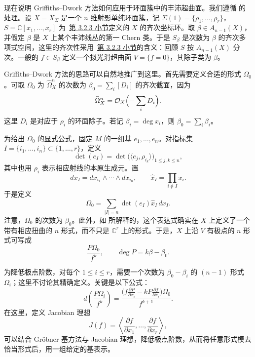 现在说明 Griffiths--Dwork 方法如何应用于环面簇中的丰沛超曲面。我们遵循  的处理。设 $X=X_\Sigma$ 是一个 $n$ 维射影单纯环面簇，记 $\Sigma(1)=\{\rho_1,\ldots,\rho_r\}$，$S=\mathbb C[x_1,\ldots,x_r]$ 为~\hyperref[subsec:homogeneous-ring]{第 3.2.3 小节}定义的 $X$ 的齐次坐标环。取 $\beta\in A_{n-1}(X)$，并假定 $\beta$ 是 $X$ 上某个丰沛线丛的第一 Chern 类。于是 $S_\beta$ 是次数为 $\beta$ 的齐次多项式空间，这里的齐次性采用~\hyperref[subsec:homogeneous-ring]{第 3.2.3 小节}的含义：回顾 $S$ 按 $A_{n-1}(X)$ 分次。一般的 $f\in S_\beta$ 定义一个拟光滑超曲面 $V=\{f=0\}$，其除子类为 $\beta$。

Griffiths--Dwork 方法的思路可以自然地推广到这里。首先需要定义合适的形式 $\Omega_0$。可取 $\Omega_0$ 为 $\widehat\Omega_X^n$ 的次数为 $\beta_0=\sum_i[D_i]$ 的齐次截面，因为
\[
\widehat\Omega_X^n=\mathcal O_X\Bigl(-\sum_iD_i\Bigr).
\]
这里 $D_i$ 是对应于 $\rho_i$ 的环面除子。若记 $\beta_i=\deg x_i$，则 $\beta_0=\sum_i\beta_i$。

为给出 $\Omega_0$ 的显式公式，固定 $M$ 的一组基 $e_1,\ldots,e_n$。对指标集 $I=\{i_1,\ldots,i_n\}\subset\{1,\ldots,r\}$，定义
\[
\det(e_I)=\det\bigl(\langle e_j,\rho_{i_k}\rangle\bigr)_{1\leq j,k\leq n},
\]
其中也用 $\rho_i$ 表示相应射线的本原生成元。置
\[
dx_I=dx_{i_1}\wedge\cdots\wedge dx_{i_n},\qquad
\widehat x_I=\prod_{i\notin I}x_i.
\]
于是定义
\begin{equation}\label{eq:toric-volume-form}
\Omega_0=\sum_{|I|=n}\det(e_I)\widehat x_I\,dx_I.
\end{equation}
注意，$\Omega_0$ 的次数为 $\beta_0$。此外，如  所解释的，这个表达式确实在 $X$ 上定义了一个带有相应扭曲的 $n$ 形式，而不只是 $\mathbb C^r$ 上的形式。于是，$X$ 上沿 $V$ 有极点的 $n$ 形式可写成
\[
\frac{P\Omega_0}{f^k},\qquad \deg P=k\beta-\beta_0.
\]

为降低极点阶数，对每个 $1\leq i\leq r$，需要一个次数为 $\beta_0-\beta_i$ 的 $(n-1)$ 形式 $\Omega_i$；这里不讨论其精确定义。关键是以下公式：
\begin{equation}\label{eq:toric-pole-reduction}
d\left(\frac{P\Omega_i}{f^k}\right)
=\frac{\bigl(f\frac{\partial P}{\partial x_i}
-kP\frac{\partial f}{\partial x_i}\bigr)\Omega_0}{f^{k+1}}.
\end{equation}
在这里，定义 Jacobian 理想
\[
J(f)=\left\langle\frac{\partial f}{\partial x_1},\ldots,
\frac{\partial f}{\partial x_r}\right\rangle,
\]
可以结合 Gröbner 基方法与 Jacobian 理想，降低极点阶数，从而将任意形式模去恰当形式后，用一组给定的基表示。


